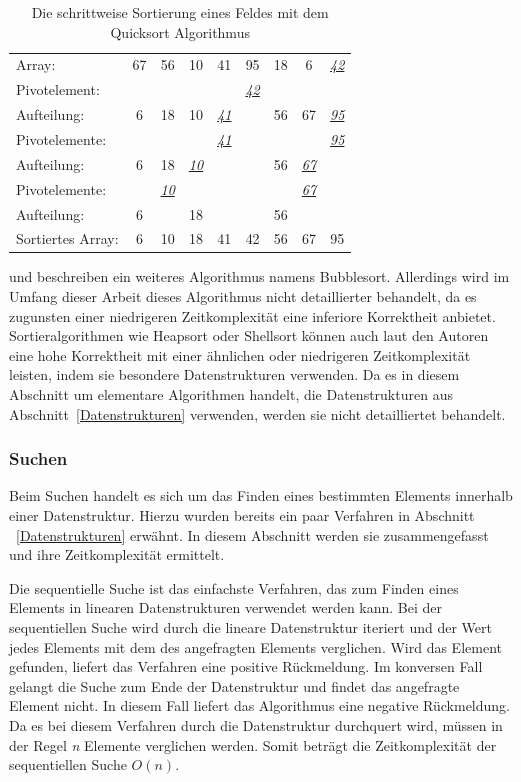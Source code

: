 \begin{table}[b]
	\centering
	\begin{tabular}{l *{8}{c}}
		\hline
		Array: & 67 & 56 & 10 & 41 & 95 & 18 & 6 & \textit{\underline{42}} \\
		Pivotelement: & & & & & \textit{\underline{42}} & & & \\
		Aufteilung: & 6 & 18 & 10 & \textit{\underline{41}} & & 56 & 67 & \textit{\underline{95}} \\
		Pivotelemente: & & & & \textit{\underline{41}} & & & & \textit{\underline{95}} \\
		Aufteilung:  & 6 & 18 & \textit{\underline{10}} & & & 56 & \textit{\underline{67}} & \\
		Pivotelemente: & & \textit{\underline{10}}  & & & & & \textit{\underline{67}} & \\
		Aufteilung: & 6 & & 18 & & & 56 & & \\
		Sortiertes Array: & 6 & 10 & 18 & 41 & 42 & 56 & 67 & 95 \\
		\hline
	\end{tabular}
	\caption{Die schrittweise Sortierung eines Feldes mit dem Quicksort Algorithmus}
	\label{table: quick_sort}
\end{table} 

\Textcite[213-214]{hubwieser_fundamente_2015} und \textcite[582-585]{ernst_grundkurs_2020} beschreiben ein weiteres Algorithmus namens Bubblesort. Allerdings wird im Umfang dieser Arbeit dieses Algorithmus nicht detaillierter behandelt, da es zugunsten einer niedrigeren Zeitkomplexität eine inferiore Korrektheit anbietet. Sortieralgorithmen wie Heapsort oder Shellsort können auch laut den Autoren eine hohe Korrektheit mit einer ähnlichen oder niedrigeren Zeitkomplexität leisten, indem sie besondere Datenstrukturen verwenden. Da es in diesem Abschnitt um elementare Algorithmen handelt, die Datenstrukturen aus Abschnitt~\ref{Datenstrukturen} verwenden, werden sie nicht detailliertet behandelt. 

\subsubsection{Suchen}
Beim Suchen handelt es sich um das Finden eines bestimmten Elements innerhalb einer Datenstruktur. Hierzu wurden bereits ein paar Verfahren in Abschnitt ~\ref{Datenstrukturen} erwähnt. In diesem Abschnitt werden sie zusammengefasst und ihre Zeitkomplexität ermittelt. 

Die sequentielle Suche ist das einfachste Verfahren, das zum Finden eines Elements in linearen Datenstrukturen verwendet werden kann. Bei der sequentiellen Suche wird durch die lineare Datenstruktur iteriert und der Wert jedes Elements mit dem des angefragten Elements verglichen. Wird das Element gefunden, liefert das Verfahren eine positive Rückmeldung. Im konversen Fall gelangt die Suche zum Ende der Datenstruktur und findet das angefragte Element nicht. In diesem Fall liefert das Algorithmus eine negative Rückmeldung. Da es bei diesem Verfahren durch die Datenstruktur durchquert wird, müssen in der Regel \textit{n} Elemente verglichen werden. Somit beträgt die Zeitkomplexität der sequentiellen Suche $O(n)$. \autocite[224]{hubwieser_fundamente_2015}


